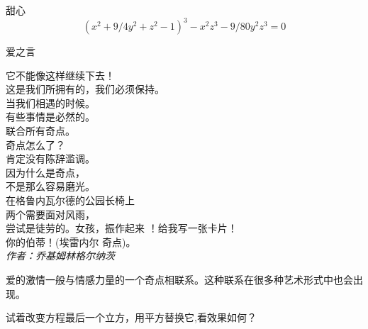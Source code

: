 ﻿\begin{surferPage}{甜心}
\[(x^2+ 9/4y^2	+ z^2- 1)^3- x^2z^3	- 9/80y^2z^3	= 0\]

\singlespacing
爱之言
\singlespacing

它不能像这样继续下去！\\
这是我们所拥有的，我们必须保持。\\
当我们相遇的时候。\\
有些事情是必然的。\\
联合所有奇点。\\
奇点怎么了？\\
肯定没有陈辞滥调。\\
因为什么是奇点，\\
不是那么容易磨光。\\
在格鲁内瓦尔德的公园长椅上\\
两个需要面对风雨，\\
尝试是徒劳的。女孩，振作起来 ！给我写一张卡片！\\
你的伯蒂！(埃雷内尔 奇点)。\\
{\it 作者：乔基姆林格尔纳茨}

\singlespacing 
爱的激情一般与情感力量的一个奇点相联系。这种联系在很多种艺术形式中也会出现。

\singlespacing 
试着改变方程最后一个立方，用平方替换它,看效果如何？
\end{surferPage}

